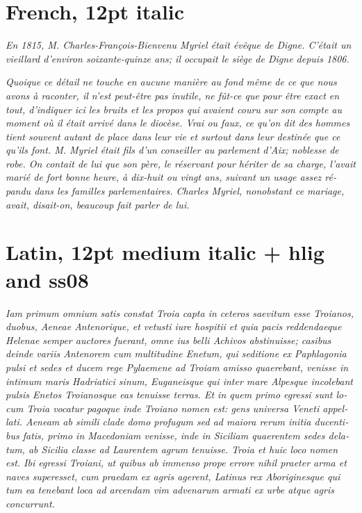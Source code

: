 \documentclass[12pt]{book}
\newcommand{\frit}[1]{\textfrench{\itshape #1}}
\newcommand{\latn}[1]{\textlatin{\itshape\addfontfeatures{Ligatures=Historic,
    Weight=500,StylisticSet=8}#1}}
\begin{document}
\section*{French, 12pt italic}

\frit{En 1815, M. Charles-François-Bienvenu Myriel était évêque de
Digne. C'était un vieillard d'environ soixante-quinze ans; il occupait
le siège de Digne depuis 1806.}

\frit{Quoique ce détail ne touche en aucune manière au fond même de ce que
nous avons à raconter, il n'est peut-être pas inutile, ne fût-ce que
pour être exact en tout, d'indiquer ici les bruits et les propos qui
avaient couru sur son compte au moment où il était arrivé dans le
diocèse. Vrai ou faux, ce qu'on dit des hommes tient souvent autant de
place dans leur vie et surtout dans leur destinée que ce qu'ils
font. M. Myriel était fils d'un conseiller au parlement d'Aix;
noblesse de robe. On contait de lui que son père, le réservant pour
hériter de sa charge, l'avait marié de fort bonne heure, à dix-huit ou
vingt ans, suivant un usage assez répandu dans les familles
parlementaires. Charles Myriel, nonobstant ce mariage, avait,
disait-on, beaucoup fait parler de lui.}

\section*{Latin, 12pt medium italic + hlig and ss08}

\latn{Iam primum omnium satis constat Troia capta in ceteros saevitum esse
Troianos, duobus, Aeneae Antenorique, et vetusti iure hospitii et quia
pacis reddendaeque Helenae semper auctores fuerant, omne ius belli
Achivos abstinuisse; casibus deinde variis Antenorem cum multitudine
Enetum, qui seditione ex Paphlagonia pulsi et sedes et ducem rege
Pylaemene ad Troiam amisso quaerebant, venisse in intimum maris
Hadriatici sinum, Euganeisque qui inter mare Alpesque incolebant
pulsis Enetos Troianosque eas tenuisse terras. Et in quem primo
egressi sunt locum Troia vocatur pagoque inde Troiano nomen est: gens
universa Veneti appellati. Aeneam ab simili clade domo profugum sed ad
maiora rerum initia ducentibus fatis, primo in Macedoniam venisse,
inde in Siciliam quaerentem sedes delatum, ab Sicilia classe ad
Laurentem agrum tenuisse. Troia et huic loco nomen est. Ibi egressi
Troiani, ut quibus ab immenso prope errore nihil praeter arma et naves
superesset, cum praedam ex agris agerent, Latinus rex Aboriginesque
qui tum ea tenebant loca ad arcendam vim advenarum armati ex urbe
atque agris concurrunt.}
\end{document}
